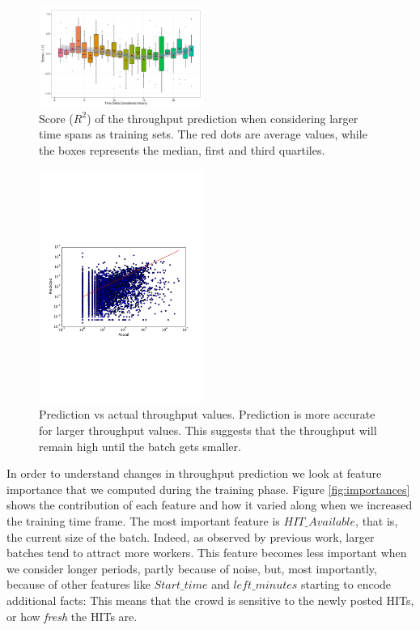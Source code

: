 \begin{figure}[tb]
	\centering
		\includegraphics[width=0.48\textwidth]{figures/ML_accuracy}
	\caption{Score ($R^2$) of the throughput prediction when considering larger time spans as training sets. The red dots are average values, while the boxes represents the median, first and third quartiles.}
	\label{fig:accuracy}
\end{figure}

\begin{figure}[tb]
	\centering
		\includegraphics[width=0.48\textwidth]{figures/predictions_3}
	\caption{Prediction vs actual throughput values. Prediction is more accurate for larger throughput values. This suggests that the throughput will remain high until the batch gets smaller.}
	\label{fig:pred}
\end{figure}

In order to understand  changes in throughput prediction we  look at  feature importance that we computed during   the training phase. Figure \ref{fig:importances} shows the  contribution of each feature and how it varied along when we increased the training time frame.
The most important feature is $HIT\_Available$, that is, the current size of the batch. Indeed, as observed by previous work, larger batches tend to attract more workers\cite{mturk,crowddb}. This feature becomes less important when we consider longer periods, partly because of  noise, but, most importantly, because of other features like $Start\_time$ and $left\_minutes$ starting to encode additional facts: This means that the crowd is sensitive to the newly posted HITs, or how \emph{fresh} the HITs are.

